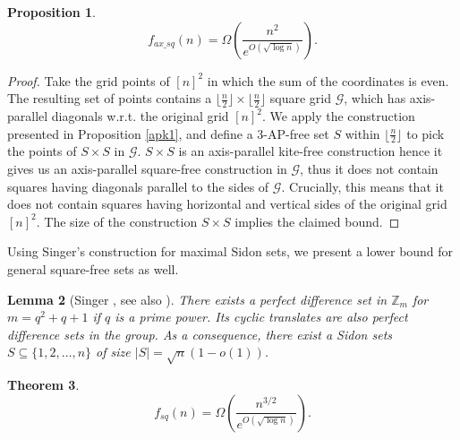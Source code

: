 \documentclass[11pt]{article}
\theoremstyle{plain}
\newtheorem{theorem}{\bf Theorem}[section]
\newtheorem{lemma}[theorem]{\bf Lemma}
\newtheorem{prop}[theorem]{\bf Proposition}
\newcommand\cG{{\mathcal G}}
\newcommand{\Z}{\mathbb{Z}}
\begin{document}
	
	
	\begin{prop}\label{axsq}
		$$f_{ax\_sq}(n)=\Omega\left(\frac{n^2}{e^{O(\sqrt{\log{n}})}}\right).$$    
	\end{prop}
	
	
	\begin{proof} Take the  grid points of $[n]^2$ in which the sum of the coordinates is even. The resulting  set of points contains 
		a $\lfloor{\frac n2\rfloor}\times \lfloor{\frac n2\rfloor}$ square grid $\cG$, which has axis-parallel diagonals w.r.t. the original grid $[n]^2$.  
		We apply the construction presented in Proposition \ref{apk1}, and define a $3$-AP-free set $S$ within $\lfloor{\frac n2\rfloor}$ to pick the points of $S\times S$ in $\cG$.  $S\times S$ is an
		axis-parallel kite-free construction hence it gives us an axis-parallel square-free construction in $\cG$, thus it does not contain  squares having diagonals parallel to the sides of $\cG$. Crucially, this means that it does not contain  squares having horizontal and vertical sides of the original grid $[n]^2$.
		The size of the construction $S\times S$ implies the claimed bound.
	\end{proof}
	
	
	Using Singer's construction for maximal Sidon sets, we present a lower bound for general square-free sets as well.
	
	\begin{lemma}[Singer  \cite{Singer-Sidon}, see also \cite{ Erdos-Sidon}]\label{Singersidon} There exists a perfect difference set in $\Z_m$ for $m=q^2+q+1$ if $q$ is a prime power. Its cyclic translates are also perfect difference sets in the group. As a consequence,
		there exist a Sidon sets $S \subseteq \{1, 2, \dots, n\}$ of size $|S|=\sqrt{n}(1-o(1))$.
	\end{lemma}
	
	
	\begin{theorem}\label{sq}
		$$f_{sq}(n)=\Omega\left(\frac{n^{3/2}}{e^{O(\sqrt{\log{n}})}}\right).$$
	\end{theorem}
	
\end{document}
